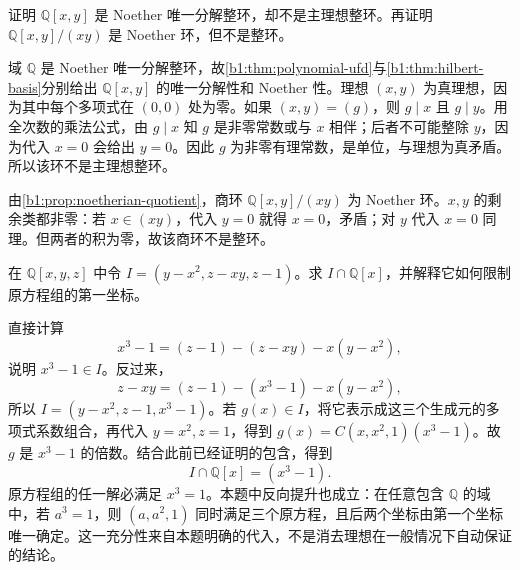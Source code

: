 \begin{exercise}\label{b1:ex:12-noetherian-not-pid}
	证明 \(\mathbb Q[x,y]\) 是 Noether 唯一分解整环，却不是主理想整环。再证明 \(\mathbb Q[x,y]/(xy)\) 是 Noether 环，但不是整环。
\end{exercise}
\begin{solution}
	域 \(\mathbb Q\) 是 Noether 唯一分解整环，故\cref{b1:thm:polynomial-ufd}与\cref{b1:thm:hilbert-basis}分别给出 \(\mathbb Q[x,y]\) 的唯一分解性和 Noether 性。理想 \((x,y)\) 为真理想，因为其中每个多项式在 \((0,0)\) 处为零。如果 \((x,y)=(g)\)，则 \(g\mid x\) 且 \(g\mid y\)。用全次数的乘法公式，由 \(g\mid x\) 知 \(g\) 是非零常数或与 \(x\) 相伴；后者不可能整除 \(y\)，因为代入 \(x=0\) 会给出 \(y=0\)。因此 \(g\) 为非零有理常数，是单位，与理想为真矛盾。所以该环不是主理想整环。

	由\cref{b1:prop:noetherian-quotient}，商环 \(\mathbb Q[x,y]/(xy)\) 为 Noether 环。\(x,y\) 的剩余类都非零：若 \(x\in(xy)\)，代入 \(y=0\) 就得 \(x=0\)，矛盾；对 \(y\) 代入 \(x=0\) 同理。但两者的积为零，故该商环不是整环。
\end{solution}

\begin{exercise}\label{b1:ex:12-elimination}
	在 \(\mathbb Q[x,y,z]\) 中令 \(I=(y-x^2,z-xy,z-1)\)。求 \(I\cap\mathbb Q[x]\)，并解释它如何限制原方程组的第一坐标。
\end{exercise}
\begin{solution}
	直接计算
	\[
		x^3-1=(z-1)-(z-xy)-x(y-x^2),
	\]
	说明 \(x^3-1\in I\)。反过来，
	\[
		z-xy=(z-1)-(x^3-1)-x(y-x^2),
	\]
	所以 \(I=(y-x^2,z-1,x^3-1)\)。若 \(g(x)\in I\)，将它表示成这三个生成元的多项式系数组合，再代入 \(y=x^2,z=1\)，得到 \(g(x)=C(x,x^2,1)(x^3-1)\)。故 \(g\) 是 \(x^3-1\) 的倍数。结合此前已经证明的包含，得到
	\[
		I\cap\mathbb Q[x]=(x^3-1).
	\]
	原方程组的任一解必满足 \(x^3=1\)。本题中反向提升也成立：在任意包含 \(\mathbb Q\) 的域中，若 \(a^3=1\)，则 \((a,a^2,1)\) 同时满足三个原方程，且后两个坐标由第一个坐标唯一确定。这一充分性来自本题明确的代入，不是消去理想在一般情况下自动保证的结论。
\end{solution}

